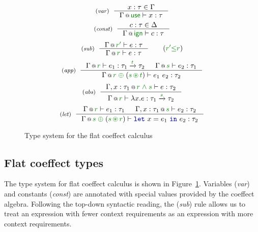 
\begin{figure}[t]
\begin{equation*}
\tyrule{var}
  {x : \tau \in \Gamma}
  {\coctx{\Gamma}{\cunit} \vdash x : \tau }
\end{equation*}
\begin{equation*}
\tyrule{const}
  {c : \tau \in \Delta}
  {\coctx{\Gamma}{\czero} \vdash c : \tau }
\end{equation*}
\begin{equation*}
\tyrule{sub}
  {\coctx{\Gamma}{\cclrd{r'}} \vdash e : \tau }
  {\coctx{\Gamma}{\cclrd{r}} \vdash e : \tau }\quad\quad(\cclrd{r'} \cleq \cclrd{r})
\end{equation*}
\begin{equation*}
\tyrule{app}
  {\coctx{\Gamma}{\cclrd{r}} \vdash e_1 : \tau_1 \xrightarrow{\cclrd{t}} \tau_2 &
   \coctx{\Gamma}{\cclrd{s}} \vdash e_2 : \tau_1 }
  {\coctx{\Gamma}{\cclrd{r} \;\cpar\; (\cclrd{s} \,\cseq\, \cclrd{t})} \vdash e_1~e_2 : \tau_2}
\end{equation*}
\begin{equation*}
\tyrule{abs}
  {\coctx{\Gamma, x:\tau_1}{\cclrd{r}\;\czip\;\cclrd{s}} \vdash e : \tau_2}
  {\coctx{\Gamma}{\cclrd{r}} \vdash \lambda x.e : \tau_1 \xrightarrow{\cclrd{s}} \tau_2 }
\end{equation*}
\begin{equation*}
\tyrule{let}
  { \coctx{\Gamma}{\cclrd{r}} \vdash e_1 : \tau_1 &
    \coctx{\Gamma, x:\tau_1}{\cclrd{s}} \vdash e_2 : \tau_2}
  {\coctx{\Gamma}{\cclrd{s} \;\cpar\; (\cclrd{s} \,\cseq\, \cclrd{r})} \vdash \kvd{let}~x=e_1~\kvd{in}~e_2 : \tau_2 }
\end{equation*}

\caption{Type system for the flat coeffect calculus}
\label{fig:flat-types}
\end{figure}


\subsection{Flat coeffect types}
\label{sec:flat-calculus-types}

The type system for flat coeffect calculus is shown in Figure~\ref{fig:flat-types}. Variables 
(\emph{var}) and constants (\emph{const}) are annotated with special values provided by the 
coeffect algebra. Following the top-down syntactic reading, the (\emph{sub}) rule allows us to 
treat an expression with fewer context requirements as an expression with more context requirements. 

